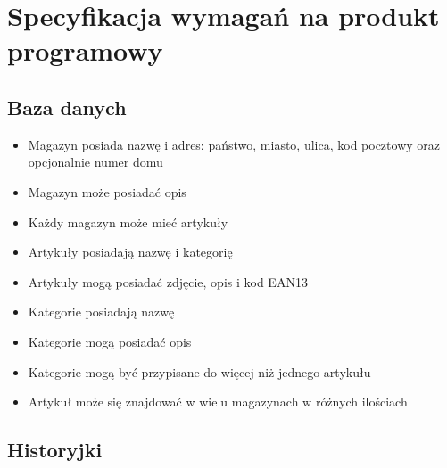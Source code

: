 \documentclass[../main.tex]{subfiles}
\begin{document}
\section{Specyfikacja wymagań na produkt programowy}
    \subsection{Baza danych}
        \begin{itemize}
            \item Magazyn posiada nazwę i adres: państwo, miasto, ulica, kod pocztowy oraz opcjonalnie numer domu 
            \item Magazyn może posiadać opis 
            \item Każdy magazyn może mieć artykuły
            \item Artykuły posiadają nazwę i kategorię
            \item Artykuły mogą posiadać zdjęcie, opis i kod EAN13
            \item Kategorie posiadają nazwę
            \item Kategorie mogą posiadać opis
            \item Kategorie mogą być przypisane do więcej niż jednego artykułu
            \item Artykuł może się znajdować w wielu magazynach w różnych ilościach
        \end{itemize}
    \subsection{Historyjki}
\end{document}
